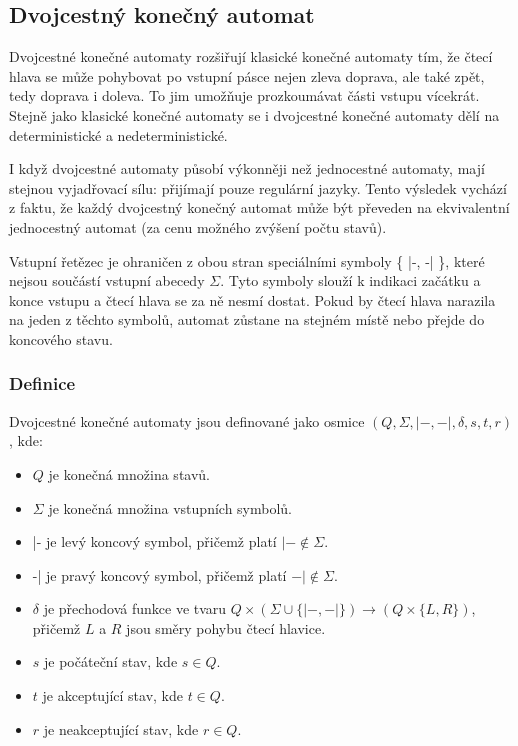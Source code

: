 \subsection{Dvojcestný konečný automat}

Dvojcestné konečné automaty rozšiřují klasické konečné automaty tím, že čtecí
hlava se může pohybovat po vstupní pásce nejen zleva doprava, ale také zpět,
tedy doprava i doleva. To jim umožňuje prozkoumávat části vstupu vícekrát.
Stejně jako klasické konečné automaty se i dvojcestné konečné automaty dělí na
deterministické a nedeterministické.

I když dvojcestné automaty působí výkonněji než jednocestné automaty, mají
stejnou vyjadřovací sílu: přijímají pouze regulární jazyky. Tento výsledek
vychází z faktu, že každý dvojcestný konečný automat může být převeden na
ekvivalentní jednocestný automat (za cenu možného zvýšení počtu stavů).

Vstupní řetězec je ohraničen z obou stran speciálními symboly \{ |-, -| \},
které nejsou součástí vstupní abecedy \(\Sigma\). Tyto symboly slouží k
indikaci začátku a konce vstupu a čtecí hlava se za ně nesmí dostat. Pokud by
čtecí hlava narazila na jeden z těchto symbolů, automat zůstane na stejném
místě nebo přejde do koncového stavu.

\subsubsection*{Definice}

Dvojcestné konečné automaty jsou definované jako osmice
\((Q, \Sigma, |-, -|, \delta, s, t, r)\), kde:
\begin{itemize}
    \item \(Q\) je konečná množina stavů.
    \item \(\Sigma\) je konečná množina vstupních symbolů.
    \item |- je levý koncový symbol, přičemž platí \(|- \notin \Sigma\).
    \item -| je pravý koncový symbol, přičemž platí \(-| \notin \Sigma\).
    \item \(\delta\) je přechodová funkce ve tvaru \(Q \times (\Sigma \cup \{
        |-, -| \}) \rightarrow (Q \times \{ L, R \})\), přičemž \(L\) a \(R\)
        jsou směry pohybu čtecí hlavice.
    \item \(s\) je počáteční stav, kde \(s \in Q\).
    \item \(t\) je akceptující stav, kde \(t \in Q\).
    \item \(r\) je neakceptující stav, kde \(r \in Q\).
\end{itemize}


